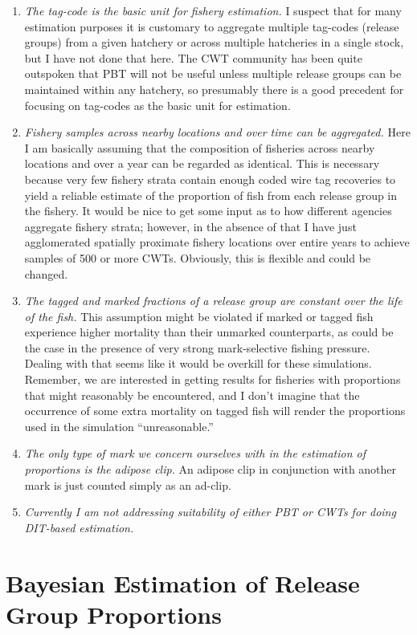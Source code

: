 \documentclass[11pt]{article}
\begin{document}
\begin{enumerate}
\item {\sl The tag-code is the basic unit for fishery estimation.} I suspect that for many estimation purposes
it is customary to aggregate multiple tag-codes (release groups) from a given hatchery or across multiple
hatcheries in a single stock, but I have not done that here.  The CWT community has been quite outspoken that
PBT will not be useful unless multiple release groups can be maintained within any hatchery, so presumably
there is a good precedent for focusing on tag-codes as the basic unit for estimation.
\item {\sl Fishery samples across nearby locations and over time can be aggregated. } Here I am basically assuming
that the composition of fisheries across nearby locations and over a year can be regarded as identical.  This is
necessary because very few fishery strata contain enough coded wire tag recoveries to yield a reliable estimate
of the proportion of fish from each release group in the fishery. It would be nice to get some input as to how
different agencies aggregate fishery strata; however, in the absence of that I have just agglomerated spatially
proximate fishery locations over entire years to achieve samples of 500 or more CWTs.  Obviously, this is 
flexible and could be changed.  
\item {\sl The tagged and marked fractions of a release group are constant over the life of the fish.}  This
assumption might be violated if marked or tagged fish experience higher mortality than their unmarked
counterparts, as could be the case in the presence of very strong mark-selective fishing pressure.  Dealing with
that seems like it would be overkill for these simulations.  Remember, we are interested in getting results
for fisheries with proportions that might reasonably be encountered, and I don't imagine that the occurrence of
some extra mortality on tagged fish will render the proportions used in the simulation ``unreasonable.''
\item {\sl The only type of mark we concern ourselves with in the estimation of proportions is the
adipose clip.}  An adipose clip in conjunction with another mark is just counted simply as an ad-clip.
\item {\sl Currently I am not addressing suitability of either PBT or CWTs for doing DIT-based estimation.}
\end{enumerate}


\section{Bayesian Estimation of Release Group Proportions}
\end{document}
